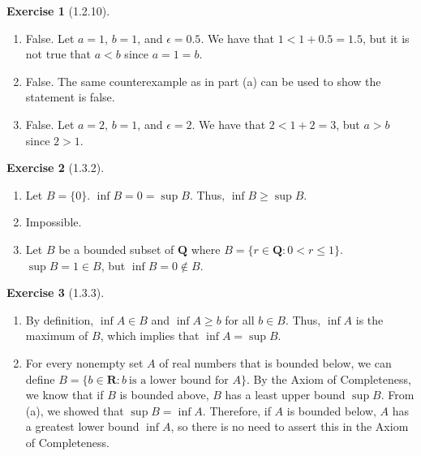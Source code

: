 \documentclass{amsart}
\theoremstyle{definition}
\newtheorem{exercise}{Exercise}
\newcommand{\Q}{\mathbf{Q}}
\newcommand{\R}{\mathbf{R}}
\newcommand{\st}{\mathrel{:}}
\begin{document}
\begin{exercise}[1.2.10]
  \begin{enumerate}[label={(\alph*)}]
    \item False. Let $a = 1$, $b = 1$, and $\epsilon = 0.5$. We have that $1 < 1
      + 0.5 = 1.5$, but it is not true that $a < b$ since $a = 1 = b$.
    \item False. The same counterexample as in part (a) can be used to show the
      statement is false.
    \item False. Let $a = 2$, $b = 1$, and $\epsilon = 2$. We have that $2 < 1 +
      2 = 3$, but $a > b$ since $2 > 1$.
  \end{enumerate}
\end{exercise}

\begin{exercise}[1.3.2]
  \begin{enumerate}[label={(\alph*)}]
    \item Let $B = \{0\}$. $\inf{B} = 0 = \sup{B}$. Thus, $\inf{B} \ge \sup{B}$.
    \item Impossible.
    \item Let $B$ be a bounded subset of $\Q$ where $B = \{r \in \Q \st 0 < r
      \le 1 \}$. $\sup{B} = 1 \in B$, but $\inf{B} = 0 \notin B$.
  \end{enumerate}
\end{exercise}

\begin{exercise}[1.3.3]
  \begin{enumerate}[label={(\alph*)}]
    \item By definition, $\inf{A} \in B$ and $\inf{A} \ge b$ for all $b \in B$.
      Thus, $\inf{A}$ is the maximum of $B$, which implies that $\inf{A} =
      \sup{B}$.
    \item For every nonempty set $A$ of real numbers that is bounded below, we
      can define $B = \{b \in \R \st b\ \text{is a lower bound for $A$}\}$. By
      the Axiom of Completeness, we know that if $B$ is bounded above, $B$ has a
      least upper bound $\sup{B}$. From (a), we showed that $\sup{B} = \inf{A}$.
      Therefore, if $A$ is bounded below, $A$ has a greatest lower bound
      $\inf{A}$, so there is no need to assert this in the Axiom of
      Completeness.
  \end{enumerate}
\end{exercise}
\end{document}
